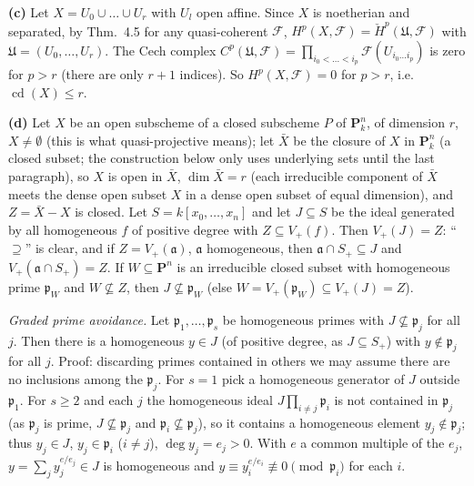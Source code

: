 \documentclass[11pt]{article}
\begin{document}
\textbf{(c)} Let $X=U_0\cup\dots\cup U_r$ with $U_l$ open affine. Since $X$ is noetherian and separated, by Thm.~4.5 for any quasi-coherent $\mathcal F$, $H^p(X,\mathcal F)=\check H^p(\mathfrak U,\mathcal F)$ with $\mathfrak U=(U_0,\dots,U_r)$. The Cech complex $C^p(\mathfrak U,\mathcal F)=\prod_{i_0<\dots<i_p}\mathcal F(U_{i_0\dots i_p})$ is zero for $p>r$ (there are only $r+1$ indices). So $H^p(X,\mathcal F)=0$ for $p>r$, i.e.\ $\operatorname{cd}(X)\le r$.

\textbf{(d)} Let $X$ be an open subscheme of a closed subscheme $P$ of $\mathbf P^n_k$, of dimension $r$, $X\neq\emptyset$ (this is what quasi-projective means); let $\bar X$ be the closure of $X$ in $\mathbf P^n_k$ (a closed subset; the construction below only uses underlying sets until the last paragraph), so $X$ is open in $\bar X$, $\dim\bar X=r$ (each irreducible component of $\bar X$ meets the dense open subset $X$ in a dense open subset of equal dimension), and $Z=\bar X-X$ is closed. Let $S=k[x_0,\dots,x_n]$ and let $J\subseteq S$ be the ideal generated by all homogeneous $f$ of positive degree with $Z\subseteq V_+(f)$. Then $V_+(J)=Z$: ``$\supseteq$'' is clear, and if $Z=V_+(\mathfrak a)$, $\mathfrak a$ homogeneous, then $\mathfrak a\cap S_+\subseteq J$ and $V_+(\mathfrak a\cap S_+)=Z$. If $W\subseteq\mathbf P^n$ is an irreducible closed subset with homogeneous prime $\mathfrak p_W$ and $W\not\subseteq Z$, then $J\not\subseteq\mathfrak p_W$ (else $W=V_+(\mathfrak p_W)\subseteq V_+(J)=Z$).

\emph{Graded prime avoidance.} Let $\mathfrak p_1,\dots,\mathfrak p_s$ be homogeneous primes with $J\not\subseteq\mathfrak p_j$ for all $j$. Then there is a homogeneous $y\in J$ (of positive degree, as $J\subseteq S_+$) with $y\notin\mathfrak p_j$ for all $j$. Proof: discarding primes contained in others we may assume there are no inclusions among the $\mathfrak p_j$. For $s=1$ pick a homogeneous generator of $J$ outside $\mathfrak p_1$. For $s\ge2$ and each $j$ the homogeneous ideal $J\prod_{i\neq j}\mathfrak p_i$ is not contained in $\mathfrak p_j$ (as $\mathfrak p_j$ is prime, $J\not\subseteq\mathfrak p_j$ and $\mathfrak p_i\not\subseteq\mathfrak p_j$), so it contains a homogeneous element $y_j\notin\mathfrak p_j$; thus $y_j\in J$, $y_j\in\mathfrak p_i$ ($i\neq j$), $\deg y_j=e_j>0$. With $e$ a common multiple of the $e_j$, $y=\sum_jy_j^{e/e_j}\in J$ is homogeneous and $y\equiv y_i^{e/e_i}\not\equiv0\pmod{\mathfrak p_i}$ for each $i$.
\end{document}
